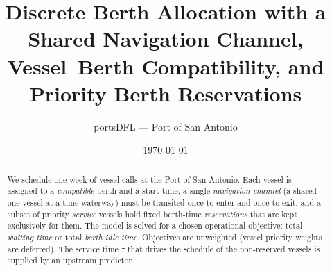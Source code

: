 \documentclass[11pt]{article}
\title{Discrete Berth Allocation with a Shared Navigation Channel,\\
Vessel--Berth Compatibility, and Priority Berth Reservations}
\author{portsDFL --- Port of San Antonio}
\date{\today}
\begin{document}
\maketitle

\begin{abstract}
We schedule one week of vessel calls at the Port of San Antonio. Each vessel is
assigned to a \emph{compatible} berth and a start time; a single
\emph{navigation channel} (a shared one-vessel-at-a-time waterway) must be
transited once to enter and once to exit; and a subset of priority
\emph{service} vessels hold fixed berth-time \emph{reservations} that are kept
exclusively for them. The model is solved for a chosen operational objective:
total \emph{waiting time} or total \emph{berth idle time}. Objectives are
unweighted (vessel priority weights are deferred). The service time $\tau$ that
drives the schedule of the non-reserved vessels is supplied by an upstream
predictor.
\end{abstract}
\end{document}
